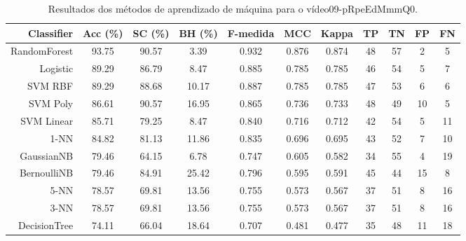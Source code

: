 \begin{table}[!htb]
\centering
\caption{Resultados dos métodos de aprendizado de máquina para o vídeo09-pRpeEdMmmQ0.}
\label{tab:09-pRpeEdMmmQ0}
\begin{tabular}{r|c|c|c|c|c|c|c|c|c|c}
\hline\hline
Classifier & Acc (\%) & SC (\%) & BH (\%) & F-medida & MCC & Kappa & TP & TN & FP & FN \\ \hline
RandomForest & 93.75 & 90.57 & 3.39 & 0.932 & 0.876 & 0.874 & 48 & 57 & 2 & 5 \\ 
Logistic & 89.29 & 86.79 & 8.47 & 0.885 & 0.785 & 0.785 & 46 & 54 & 5 & 7 \\ 
SVM RBF & 89.29 & 88.68 & 10.17 & 0.887 & 0.785 & 0.785 & 47 & 53 & 6 & 6 \\ 
SVM Poly & 86.61 & 90.57 & 16.95 & 0.865 & 0.736 & 0.733 & 48 & 49 & 10 & 5 \\ 
SVM Linear & 85.71 & 79.25 & 8.47 & 0.840 & 0.716 & 0.712 & 42 & 54 & 5 & 11 \\ 
1-NN & 84.82 & 81.13 & 11.86 & 0.835 & 0.696 & 0.695 & 43 & 52 & 7 & 10 \\ 
GaussianNB & 79.46 & 64.15 & 6.78 & 0.747 & 0.605 & 0.582 & 34 & 55 & 4 & 19 \\ 
BernoulliNB & 79.46 & 84.91 & 25.42 & 0.796 & 0.595 & 0.591 & 45 & 44 & 15 & 8 \\ 
5-NN & 78.57 & 69.81 & 13.56 & 0.755 & 0.573 & 0.567 & 37 & 51 & 8 & 16 \\ 
3-NN & 78.57 & 69.81 & 13.56 & 0.755 & 0.573 & 0.567 & 37 & 51 & 8 & 16 \\ 
DecisionTree & 74.11 & 66.04 & 18.64 & 0.707 & 0.481 & 0.477 & 35 & 48 & 11 & 18 \\ 
\hline\hline
\end{tabular}
\end{table}
